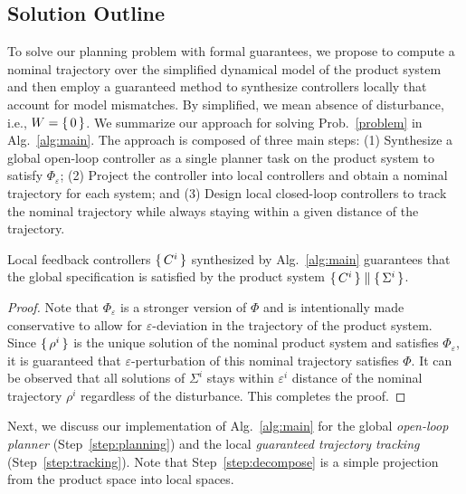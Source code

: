 

\subsection{Solution Outline}
To solve our planning problem with formal guarantees, we propose to compute a nominal trajectory over the simplified dynamical model of the product system and then employ a guaranteed method to synthesize controllers locally that account for model mismatches. By simplified, we mean absence of disturbance, i.e., $W=\set{0}$.
We summarize our approach for solving Prob.~\ref{problem} in Alg.~\ref{alg:main}.
The approach is composed of three main steps:
(1) Synthesize a global open-loop controller as a single planner task on the product system to satisfy $\Phi_\varepsilon$;
(2) Project the controller into local controllers and obtain a nominal trajectory for each system; and
(3) Design local closed-loop controllers to track the nominal trajectory while always staying within a given distance of the trajectory.  

\begin{theorem}
Local feedback controllers $\set{C^i}$ synthesized by Alg.~\ref{alg:main} guarantees that the global specification is satisfied by the product system $\set{C^i}\parallel \set{\Sigma^i}$. 
\end{theorem}
\begin{proof}
Note that $\Phi_\varepsilon$ is a stronger version of $\Phi$ and is intentionally made conservative to allow for $\varepsilon$-deviation in the trajectory of the product system.
Since $\set{\rho^i}$ is the unique solution of the nominal product system and satisfies $\Phi_\varepsilon$, it is guaranteed that $\varepsilon$-perturbation of this nominal trajectory satisfies $\Phi$.
It can be observed that all solutions of $\Sigma^i$ stays within $\varepsilon^i$ distance of the nominal trajectory $\rho^i$ regardless of the disturbance. This completes the proof.
\end{proof}

Next, we discuss our implementation of Alg.~\ref{alg:main} for the global \emph{open-loop planner} (Step~\ref{step:planning}) and the local \emph{guaranteed trajectory tracking} (Step~\ref{step:tracking}). Note that Step~\ref{step:decompose} is a simple projection from the product space into local spaces.


